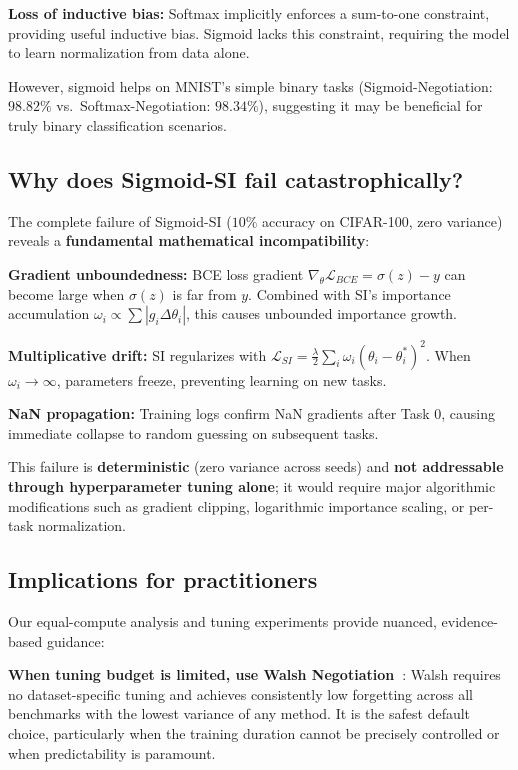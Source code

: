 \documentclass[preprint,review,12pt]{elsarticle}
\begin{document}
\textbf{Loss of inductive bias:} Softmax implicitly enforces a sum-to-one constraint, providing useful inductive bias. Sigmoid lacks this constraint, requiring the model to learn normalization from data alone.

However, sigmoid helps on MNIST's simple binary tasks (Sigmoid-Negotiation: $98.82\%$ vs.\ Softmax-Negotiation: $98.34\%$), suggesting it may be beneficial for truly binary classification scenarios.

\subsection{Why does Sigmoid-SI fail catastrophically?}

The complete failure of Sigmoid-SI ($10\%$ accuracy on CIFAR-100, zero variance) reveals a \textbf{fundamental mathematical incompatibility}:

\textbf{Gradient unboundedness:} BCE loss gradient $\nabla_{\theta} \mathcal{L}_{BCE} = \sigma(z) - y$ can become large when $\sigma(z)$ is far from $y$. Combined with SI's importance accumulation $\omega_i \propto \sum |g_i \Delta\theta_i|$, this causes unbounded importance growth.

\textbf{Multiplicative drift:} SI regularizes with $\mathcal{L}_{SI} = \frac{\lambda}{2} \sum_i \omega_i (\theta_i - \theta^*_i)^2$. When $\omega_i \to \infty$, parameters freeze, preventing learning on new tasks.

\textbf{NaN propagation:} Training logs confirm NaN gradients after Task 0, causing immediate collapse to random guessing on subsequent tasks.

This failure is \textbf{deterministic} (zero variance across seeds) and \textbf{not addressable through hyperparameter tuning alone}; it would require major algorithmic modifications such as gradient clipping, logarithmic importance scaling, or per-task normalization.

\subsection{Implications for practitioners}

Our equal-compute analysis and tuning experiments provide nuanced, evidence-based guidance:

\textbf{When tuning budget is limited, use Walsh Negotiation~\cite{korhan2023negotiated}}: Walsh requires no dataset-specific tuning and achieves consistently low forgetting across all benchmarks with the lowest variance of any method. It is the safest default choice, particularly when the training duration cannot be precisely controlled or when predictability is paramount.
\end{document}
